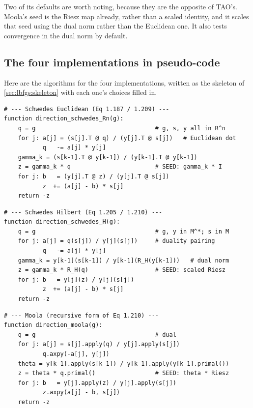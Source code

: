\documentclass[a4paper,11pt]{article}
\theoremstyle{spacedplain} \newtheorem{theorem}[counter]{Theorem} \newtheorem{lemma}[counter]{Lemma} \newtheorem{prop}[counter]{Proposition} \newtheorem{cor}[counter]{Corollary}
\theoremstyle{spaceddefinition} \newtheorem{defn}[counter]{Definition} \newtheorem{example}[counter]{Example} \newtheorem{remark}[counter]{Remark}
\begin{document}
Two of its defaults are worth noting, because they are the opposite of TAO's. Moola's seed is the Riesz map already, rather than a scaled identity, and it scales that seed using the dual norm rather than the Euclidean one. It also tests convergence in the dual norm by default.

\subsection{The four implementations in pseudo-code}
\label{sec:lbfgs:instantiations}

Here are the algorithms for the four implementations, written as the skeleton of \cref{sec:lbfgs:skeleton} with each one's choices filled in.

\begin{lstlisting}[basicstyle=\ttfamily\footnotesize]
# --- Schwedes Euclidean (Eq 1.187 / 1.209) ---
function direction_schwedes_Rn(g):
    q = g                                  # g, s, y all in R^n
    for j: a[j] = (s[j].T @ q) / (y[j].T @ s[j])   # Euclidean dot
           q   -= a[j] * y[j]
    gamma_k = (s[k-1].T @ y[k-1]) / (y[k-1].T @ y[k-1])
    z = gamma_k * q                        # SEED: gamma_k * I
    for j: b   = (y[j].T @ z) / (y[j].T @ s[j])
           z  += (a[j] - b) * s[j]
    return -z
\end{lstlisting}

\begin{lstlisting}[basicstyle=\ttfamily\footnotesize]
# --- Schwedes Hilbert (Eq 1.205 / 1.210) ---
function direction_schwedes_H(g):
    q = g                                  # g, y in M^*; s in M
    for j: a[j] = q(s[j]) / y[j](s[j])     # duality pairing
           q   -= a[j] * y[j]
    gamma_k = y[k-1](s[k-1]) / y[k-1](R_H(y[k-1]))   # dual norm
    z = gamma_k * R_H(q)                   # SEED: scaled Riesz
    for j: b   = y[j](z) / y[j](s[j])
           z  += (a[j] - b) * s[j]
    return -z
\end{lstlisting}

\begin{lstlisting}[basicstyle=\ttfamily\footnotesize]
# --- Moola (recursive form of Eq 1.210) ---
function direction_moola(g):
    q = g                                  # dual
    for j: a[j] = s[j].apply(q) / y[j].apply(s[j])
           q.axpy(-a[j], y[j])
    theta = y[k-1].apply(s[k-1]) / y[k-1].apply(y[k-1].primal())
    z = theta * q.primal()                 # SEED: theta * Riesz
    for j: b   = y[j].apply(z) / y[j].apply(s[j])
           z.axpy(a[j] - b, s[j])
    return -z
\end{lstlisting}
\end{document}
